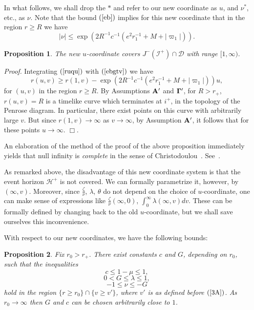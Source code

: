 \documentclass{article}
\newtheorem{proposition}{Proposition}[section]
\newcommand{\zn}{\frac{\zeta}{\nu}}
\begin{document}
In what follows, we shall drop the $*$ and refer to our new coordinate as $u$,
and $\nu^*$, etc., as $\nu$.
Note that the bound $(\ref{eb})$ 
implies for this new coordinate that in the region $r\ge R$ we have
\begin{equation}
\label{ebgtv}
|\nu|\le\exp\left(2R^{-1}c^{-1}(e^2r_1^{-1}+M+|\varpi_1|)\right).
\end{equation}


\begin{proposition} The new $u$-coordinate covers $J^{-}(\mathcal{I}^+)\cap\mathcal{D}$
with range $[1,\infty)$.
\end{proposition}

\noindent\emph{Proof.}
Integrating $(\ref{ruqu})$ with $(\ref{ebgtv})$ we have
\[
r(u,v)\ge r(1,v)-\exp\left(2R^{-1}c^{-1}(e^2r_1^{-1}+M+|\varpi_1|)\right)u,
\]
for $(u,v)$ in the region $r\ge R$.
By Assumptions ${\bf A}'$ and ${\bf \Gamma}'$, for $R>r_+$, $r(u,v)=R$ is
a timelike curve which terminates at $i^+$, in the topology of the Penrose
diagram. In particular, there exist
points on this curve with arbitrarily large $v$. But since 
$r(1,v)\to\infty$ as $v\to\infty$, by Assumption ${\bf A}'$, it follows
that for these points $u\to\infty$. $\Box$.

An elaboration of the
method of the proof of the above proposition immediately yields that
null infinity is \emph{complete} in the sense of Christodoulou~\cite{chr:givp}.
See~\cite{md:sssts}.

As remarked above, the disadvantage of this new coordinate system is that
the event horizon $\mathcal{H}^+$ is not covered. We can formally
parametrize it, however, by $(\infty,v)$.
Moreover, since $\zn$, $\lambda$, $\theta$ do not depend on the choice
of $u$-coordinate, one can make sense of 
expressions like $\zn(\infty,0)$,
$\int_0^\infty\lambda(\infty,v)dv$. These can be formally defined by
changing back to the old $u$-coordinate, but we shall save ourselves
this inconvenience. 

With respect to our new coordinates, we have the following bounds:
\begin{proposition}
\label{taG}
Fix $r_0>r_+$. There exist constants $c$ and $G$, depending on $r_0$, such that
the inequalities 
\begin{equation}
\label{1-mPK}
c\le1-\mu\le1,
\end{equation}
\begin{equation}
\label{upo1}
0<G\le\lambda\le 1,
\end{equation}
\begin{equation}
\label{upo2}
-1\le\nu\le-G
\end{equation}
hold in the region $\{r\ge r_0\}\cap\{v\ge v'\}$, where
$v'$ is as defined before $(\ref{3A})$.
As $r_0\to\infty$ then $G$ and $c$ can be chosen arbitrarily close to $1$.
\end{proposition}
\end{document}
